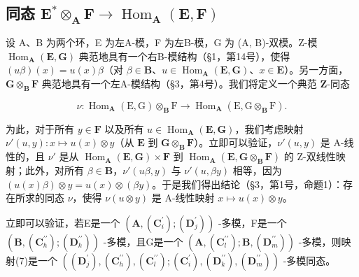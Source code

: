 \subsection{\texorpdfstring{同态 \(\mathbf{E}^* \otimes_{\mathbf{A}} \mathbf{F} \to \operatorname{Hom}_{\mathbf{A}}(\mathbf{E}, \mathbf{F})\)}{同态 \textbackslash mathbf\{E\}\^{}* \textbackslash otimes\_\{\textbackslash mathbf\{A\}\} \textbackslash mathbf\{F\} \textbackslash 到 \textbackslash operatorname\{Hom\}\_\{\textbackslash mathbf\{A\}\}(\textbackslash mathbf\{E\}, \textbackslash mathbf\{F\})}}

设 A、B 为两个环，E 为左A-模，F 为左B-模，G 为 (A, B)-双模。Z-模 \(\operatorname{Hom}_{\mathbf{A}}(\mathbf{E}, \mathbf{G})\) 典范地具有一个右B-模结构（§1，第14号），使得 \((u\beta)(x) = u(x)\beta\)（对 \(\beta \in \mathbf{B}\)、\(u \in \operatorname{Hom}_{\mathbf{A}}(\mathbf{E}, \mathbf{G})\)、\(x \in \mathbf{E}\)）。另一方面，\(\mathbf{G} \otimes_{\mathbf{B}} \mathbf{F}\) 典范地具有一个左A-模结构（§3，第4号）。我们将定义一个典范 \(\mathbf{Z}\)-同态

\[
\nu : \operatorname{Hom} _ {\mathbf {A}} (\mathrm{E}, \mathrm{G}) \otimes_ {\mathbf {B}} \mathrm{F} \rightarrow \operatorname{Hom} _ {\mathbf {A}} (\mathrm{E}, \mathrm{G} \otimes_ {\mathbf {B}} \mathrm{F}).\tag{7}
\]

为此，对于所有 \(y \in \mathbf{F}\) 以及所有 \(u \in \operatorname{Hom}_{\mathbf{A}}(\mathbf{E}, \mathbf{G})\)，我们考虑映射 \(\nu'(u, y): x \mapsto u(x) \otimes y\)（从 \(\mathbf{E}\) 到 \(\mathbf{G} \otimes_{\mathbf{B}} \mathbf{F}\)）。立即可以验证，\(\nu'(u, y)\) 是 A-线性的，且 \(\nu'\) 是从 \(\operatorname{Hom}_{\mathbf{A}}(\mathbf{E}, \mathbf{G}) \times \mathbf{F}\) 到 \(\operatorname{Hom}_{\mathbf{A}}(\mathbf{E}, \mathbf{G} \otimes_{\mathbf{B}} \mathbf{F})\) 的 Z-双线性映射；此外，对所有 \(\beta \in \mathbf{B}\)，\(\nu'(u\beta, y)\) 与 \(\nu'(u, \beta y)\) 相等，因为 \((u(x)\beta) \otimes y = u(x) \otimes (\beta y)\)。于是我们得出结论（§3，第1号，命题1）：存在所求的同态 \(\nu\)，使得 \(\nu(u \otimes y)\) 是 A-线性映射 \(x \mapsto u(x) \otimes y\)。

立即可以验证，若E是一个 \((\mathbf{A}, (\mathbf{C}_{i}^{\prime}) ; (\mathbf{D}_{j}^{\prime}))\) -多模，F是一个 \((\mathbf{B}, (\mathbf{C}_{h}^{\prime\prime}) ; (\mathbf{D}_{k}^{\prime\prime}))\) -多模，且G是一个 \((\mathbf{A}, (\mathbf{C}_{l}^{\prime\prime}) ; \mathbf{B}, (\mathbf{D}_{m}^{\prime\prime}))\) -多模，则映射(7)是一个 \(((\mathbf{D}_{j}^{\prime}), (\mathbf{C}_{h}^{\prime\prime}), (\mathbf{C}_{l}^{\prime\prime}) ; (\mathbf{C}_{i}^{\prime}), (\mathbf{D}_{k}^{\prime\prime}), (\mathbf{D}_{m}^{\prime\prime}))\) -多模同态。

